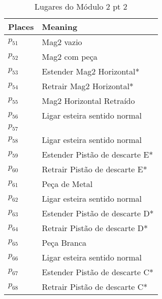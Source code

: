 \begin{table}[htbp]
\caption{Lugares do Módulo 2 pt 2}
\centering
\begin{tabular}{ll}
Places & Meaning\\
\hline
\hyperlink{partialNet:p51}{\hypertarget{partialTable:p51}{$p_{51}$}} & Mag2 vazio\\
\hyperlink{partialNet:p52}{\hypertarget{partialTable:p52}{$p_{52}$}} & Mag2 com peça\\
\hyperlink{partialNet:p53}{\hypertarget{partialTable:p53}{$p_{53}$}} & Estender Mag2 Horizontal*\\
\hyperlink{partialNet:p54}{\hypertarget{partialTable:p54}{$p_{54}$}} & Retrair Mag2 Horizontal*\\
\hyperlink{partialNet:p55}{\hypertarget{partialTable:p55}{$p_{55}$}} & Mag2 Horizontal Retraído\\
\hyperlink{partialNet:p56}{\hypertarget{partialTable:p56}{$p_{56}$}} & Ligar esteira sentido normal\\
\hyperlink{partialNet:p57}{\hypertarget{partialTable:p57}{$p_{57}$}} & \\
\hyperlink{partialNet:p58}{\hypertarget{partialTable:p58}{$p_{58}$}} & Ligar esteira sentido normal\\
\hyperlink{partialNet:p59}{\hypertarget{partialTable:p59}{$p_{59}$}} & Estender Pistão de descarte E*\\
\hyperlink{partialNet:p60}{\hypertarget{partialTable:p60}{$p_{60}$}} & Retrair Pistão de descarte E*\\
\hyperlink{partialNet:p61}{\hypertarget{partialTable:p61}{$p_{61}$}} & Peça de Metal\\
\hyperlink{partialNet:p62}{\hypertarget{partialTable:p62}{$p_{62}$}} & Ligar esteira sentido normal\\
\hyperlink{partialNet:p63}{\hypertarget{partialTable:p63}{$p_{63}$}} & Estender Pistão de descarte D*\\
\hyperlink{partialNet:p64}{\hypertarget{partialTable:p64}{$p_{64}$}} & Retrair Pistão de descarte D*\\
\hyperlink{partialNet:p65}{\hypertarget{partialTable:p65}{$p_{65}$}} & Peça Branca\\
\hyperlink{partialNet:p66}{\hypertarget{partialTable:p66}{$p_{66}$}} & Ligar esteira sentido normal\\
\hyperlink{partialNet:p67}{\hypertarget{partialTable:p67}{$p_{67}$}} & Estender Pistão de descarte C*\\
\hyperlink{partialNet:p68}{\hypertarget{partialTable:p68}{$p_{68}$}} & Retrair Pistão de descarte C*\\

\end{tabular}
\end{table}
